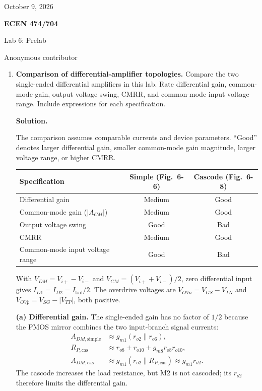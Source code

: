 \documentclass[12pt,letterpaper]{article}
\begin{document}
{\fontsize{11}{12.65}\selectfont
\hfill October 9, 2026\par}
{\centering
{\fontsize{14}{16.1}\selectfont\sffamily\bfseries ECEN 474/704\par}
{\fontsize{14}{16.1}\selectfont Lab 6: Prelab\par}
{\fontsize{14}{16.1}\selectfont Anonymous contributor\par}
}
\vspace{12pt}
\begin{enumerate}

\item \textbf{Comparison of differential-amplifier topologies.}
Compare the two single-ended differential amplifiers in this lab.
Rate differential gain, common-mode gain, output voltage swing,
CMRR, and common-mode input voltage range. Include expressions
for each specification.

\textbf{Solution.}

The comparison assumes comparable currents and device parameters.
``Good'' denotes larger differential gain, smaller
common-mode gain magnitude, larger voltage range, or higher CMRR.

\begin{center}
\small
\setlength{\tabcolsep}{4pt}
\begin{tabular}{@{}lcc@{}}
\toprule
Specification & Simple (Fig.~6-6) & Cascode (Fig.~6-8)\\
\midrule
Differential gain & Medium & Good\\
Common-mode gain ($|A_{CM}|$) & Medium & Good\\
Output voltage swing & Good & Bad\\
CMRR & Medium & Good\\
Common-mode input voltage range & Good & Bad\\
\bottomrule
\end{tabular}
\end{center}

With $V_{DM}=V_{i+}-V_{i-}$ and
$V_{CM}=(V_{i+}+V_{i-})/2$, zero differential input gives
$I_{D1}=I_{D2}=I_{\mathrm{tail}}/2$.
The overdrive voltages are $V_{OVn}=V_{GS}-V_{TN}$ and
$V_{OVp}=V_{SG}-|V_{TP}|$, both positive.

\textbf{(a) Differential gain.}
The single-ended gain has no factor of $1/2$ because the PMOS
mirror combines the two input-branch signal currents:
\begin{align*}
A_{DM,\mathrm{simple}}&\approx g_{m1}(r_{o2}\parallel r_{o6}),\\
R_{P,\mathrm{cas}}&\approx r_{o8}+r_{o10}+g_{m8}r_{o8}r_{o10},\\
A_{DM,\mathrm{cas}}&\approx
g_{m1}(r_{o2}\parallel R_{P,\mathrm{cas}})\approx g_{m1}r_{o2}.
\end{align*}
The cascode increases the load resistance, but M2 is not cascoded;
its $r_{o2}$ therefore limits the differential gain.


\end{enumerate}
\end{document}

